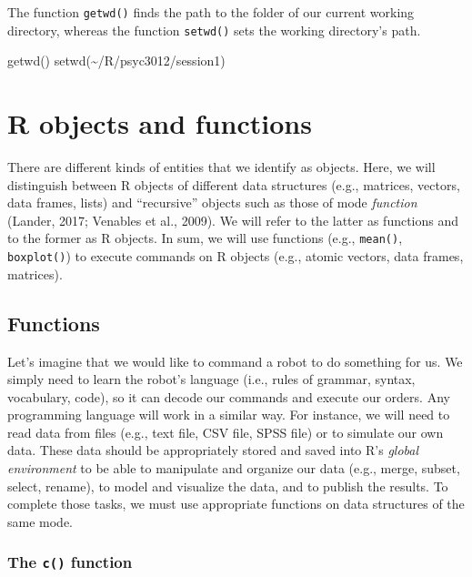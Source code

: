 \documentclass[
]{book}
\newenvironment{Shaded}{\begin{snugshade}}{\end{snugshade}}
\newcommand{\FunctionTok}[1]{\textcolor[rgb]{0.00,0.00,0.00}{#1}}
\newcommand{\NormalTok}[1]{#1}
\newcommand{\StringTok}[1]{\textcolor[rgb]{0.31,0.60,0.02}{#1}}
\theoremstyle{definition}
\theoremstyle{definition}
\theoremstyle{definition}
\theoremstyle{definition}
\theoremstyle{remark}
\begin{document}
The function \texttt{getwd()} finds the path to the folder of our current working directory, whereas the function \texttt{setwd()} sets the working directory's path.

\begin{Shaded}
\begin{Highlighting}[]

\FunctionTok{getwd}\NormalTok{()}
\FunctionTok{setwd}\NormalTok{(}\StringTok{\textquotesingle{}\textasciitilde{}/R/psyc3012/session1\textquotesingle{}}\NormalTok{)}
\end{Highlighting}
\end{Shaded}

\hypertarget{r-objects-and-functions}{%
\section{R objects and functions}\label{r-objects-and-functions}}

There are different kinds of entities that we identify as objects. Here, we will distinguish between R objects of different data structures (e.g., matrices, vectors, data frames, lists) and ``recursive'' objects such as those of mode \emph{function} (Lander, 2017; Venables et al., 2009). We will refer to the latter as functions and to the former as R objects. In sum, we will use functions (e.g., \texttt{mean()}, \texttt{boxplot()}) to execute commands on R objects (e.g., atomic vectors, data frames, matrices).

\hypertarget{functions}{%
\subsection{Functions}\label{functions}}

Let's imagine that we would like to command a robot to do something for us. We simply need to learn the robot's language (i.e., rules of grammar, syntax, vocabulary, code), so it can decode our commands and execute our orders. Any programming language will work in a similar way. For instance, we will need to read data from files (e.g., text file, CSV file, SPSS file) or to simulate our own data. These data should be appropriately stored and saved into R's \emph{global environment} to be able to manipulate and organize our data (e.g., merge, subset, select, rename), to model and visualize the data, and to publish the results. To complete those tasks, we must use appropriate functions on data structures of the same mode.

\hypertarget{the-c-function}{%
\subsubsection{\texorpdfstring{The \texttt{c()} function}{The c() function}}\label{the-c-function}}
\end{document}
